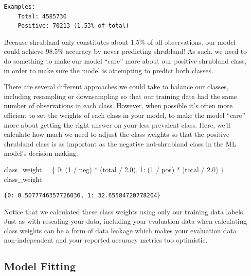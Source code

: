 \documentclass[
  letterpaper,
  DIV=11,
  numbers=noendperiod]{scrartcl}
\newenvironment{Shaded}{\begin{snugshade}}{\end{snugshade}}
\newcommand{\DecValTok}[1]{\textcolor[rgb]{0.68,0.00,0.00}{#1}}
\newcommand{\FloatTok}[1]{\textcolor[rgb]{0.68,0.00,0.00}{#1}}
\newcommand{\NormalTok}[1]{\textcolor[rgb]{0.00,0.23,0.31}{#1}}
\newcommand{\OperatorTok}[1]{\textcolor[rgb]{0.37,0.37,0.37}{#1}}
\begin{document}
\begin{verbatim}
Examples:
    Total: 4585730
    Positive: 70213 (1.53% of total)
\end{verbatim}

Because shrubland only constitutes about 1.5\% of all observations, our
model could achieve 98.5\% accuracy by never predicting shrubland! As
such, we need to do something to make our model ``care'' more about our
positive shrubland class, in order to make sure the model is attempting
to predict both classes.

There are several different approaches we could take to balance our
classes, including resampling or downsampling so that our training data
had the same number of observations in each class. However, when
possible it's often more efficient to set the weights of each class in
your model, to make the model ``care'' more about getting the right
answer on your less prevalent class. Here, we'll calculate how much we
need to adjust the class weights so that the positive shrubland class is
as important as the negative not-shrubland class in the ML model's
decision making:

\begin{Shaded}
\begin{Highlighting}[]
\NormalTok{class\_weight }\OperatorTok{=}\NormalTok{ \{}
    \DecValTok{0}\NormalTok{: (}\DecValTok{1} \OperatorTok{/}\NormalTok{ neg) }\OperatorTok{*}\NormalTok{ (total }\OperatorTok{/} \FloatTok{2.0}\NormalTok{), }
    \DecValTok{1}\NormalTok{: (}\DecValTok{1} \OperatorTok{/}\NormalTok{ pos) }\OperatorTok{*}\NormalTok{ (total }\OperatorTok{/} \FloatTok{2.0}\NormalTok{)}
\NormalTok{\}}
\NormalTok{class\_weight}
\end{Highlighting}
\end{Shaded}

\begin{verbatim}
{0: 0.5077746357726036, 1: 32.65584720778204}
\end{verbatim}

Notice that we calculated these class weights using only our training
data labels. Just as with rescaling your data, including your evaluation
data when calculating class weights can be a form of data leakage which
makes your evaluation data non-independent and your reported accuracy
metrics too optimistic.

\hypertarget{model-fitting}{%
\subsection{Model Fitting}\label{model-fitting}}
\end{document}
